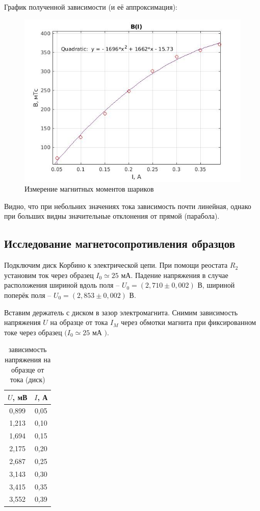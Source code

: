 \documentclass[a4paper, 12pt]{article}%
\begin{document}
График полученной зависимости (и её аппроксимация):

\begin{center}
\begin{figure}[h]
    \centering
    \includegraphics[width = 10 cm]{B(I).jpg}
    \caption{Измерение магнитных моментов шариков}
    \label{msh1}
\end{figure}
\end{center}

Видно, что при небольних значениях тока зависимость почти линейная, однако при больших видны значительные отклонения от прямой (парабола).


\subsection{Исследование магнетосопротивления образцов}

Подключим диск Корбино к электрической цепи. При помощи реостата $R_{2}$ установим ток через образец $I_{0} \simeq 25$ мА. Падение напряжения в случае расположения шириной вдоль поля -- $U_0 = (2,710\pm 0,002)$ В, шириной поперёк поля -- $U_0 = (2,853 \pm 0,002)$ В.

Вставим держатель с диском в зазор электромагнита. Снимим зависимость напряжения $U$ на образце от тока $I_{M}$ через обмотки магнита при фиксированном токе через образец $(I_{0} \simeq 25$ мА $) .$

\begin{table}[!h]
\begin{center}
\begin{tabular}{|c|c|}
\hline $U$, мВ & $I$, А\\
\hline 0,899 & 0,05 \\
\hline 1,213 & 0,10 \\
\hline 1,694 & 0,15 \\
\hline 2,175 & 0,20 \\
\hline 2,687 & 0,25 \\
\hline 3,143 & 0,30 \\
\hline 3,415 & 0,35 \\
\hline 3,552 & 0,39 \\
\hline
\end{tabular}
\end{center}
\caption{зависимость напряжения на образце от тока (диск)}
\end{table}
\end{document}
